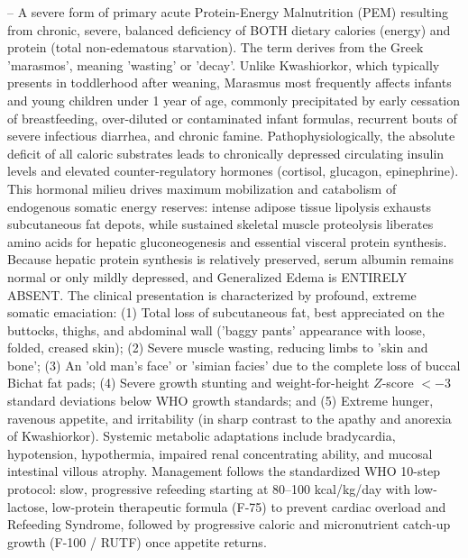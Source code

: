 -- A severe form of primary acute Protein-Energy Malnutrition (PEM) resulting from chronic, severe, balanced deficiency of BOTH dietary calories (energy) and protein (total non-edematous starvation). The term derives from the Greek 'marasmos', meaning 'wasting' or 'decay'. Unlike Kwashiorkor, which typically presents in toddlerhood after weaning, Marasmus most frequently affects infants and young children under 1 year of age, commonly precipitated by early cessation of breastfeeding, over-diluted or contaminated infant formulas, recurrent bouts of severe infectious diarrhea, and chronic famine. Pathophysiologically, the absolute deficit of all caloric substrates leads to chronically depressed circulating insulin levels and elevated counter-regulatory hormones (cortisol, glucagon, epinephrine). This hormonal milieu drives maximum mobilization and catabolism of endogenous somatic energy reserves: intense adipose tissue lipolysis exhausts subcutaneous fat depots, while sustained skeletal muscle proteolysis liberates amino acids for hepatic gluconeogenesis and essential visceral protein synthesis. Because hepatic protein synthesis is relatively preserved, serum albumin remains normal or only mildly depressed, and Generalized Edema is ENTIRELY ABSENT. The clinical presentation is characterized by profound, extreme somatic emaciation: (1) Total loss of subcutaneous fat, best appreciated on the buttocks, thighs, and abdominal wall ('baggy pants' appearance with loose, folded, creased skin); (2) Severe muscle wasting, reducing limbs to 'skin and bone'; (3) An 'old man's face' or 'simian facies' due to the complete loss of buccal Bichat fat pads; (4) Severe growth stunting and weight-for-height $Z$-score $<-3$ standard deviations below WHO growth standards; and (5) Extreme hunger, ravenous appetite, and irritability (in sharp contrast to the apathy and anorexia of Kwashiorkor). Systemic metabolic adaptations include bradycardia, hypotension, hypothermia, impaired renal concentrating ability, and mucosal intestinal villous atrophy. Management follows the standardized WHO 10-step protocol: slow, progressive refeeding starting at 80--100 kcal/kg/day with low-lactose, low-protein therapeutic formula (F-75) to prevent cardiac overload and Refeeding Syndrome, followed by progressive caloric and micronutrient catch-up growth (F-100 / RUTF) once appetite returns.

